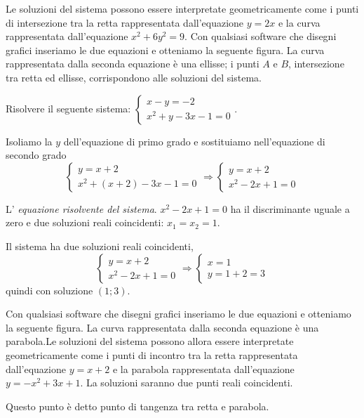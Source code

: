 \begin{esempio}
\begin{multicols}{2}
Le soluzioni del sistema possono essere interpretate geometricamente come i 
punti di intersezione tra la retta rappresentata dall'equazione $y=2x$ e la 
curva rappresentata dall'equazione $x^2+6y^2=9$. Con qualsiasi software che 
disegni grafici inseriamo le due equazioni e otteniamo la seguente figura.
La curva rappresentata dalla seconda equazione è una ellisse; i punti $ A $ e $ 
B $, intersezione tra retta ed ellisse, corrispondono alle soluzioni del 
sistema.
\begin{center}

\end{center}
 \end{multicols}
\end{esempio}

\begin{esempio}
Risolvere il seguente sistema: $\left\{\begin{array}{l}x-y=-2 
\\x^2+y-3x-1=0\end{array}\right..$

Isoliamo la $y$ dell'equazione di primo grado e sostituiamo nell'equazione di 
secondo grado 
\[\left\{\begin{array}{l}y=x+2 \\
x^2+\left(x+2\right)-3x-1=0\end{array}\right. 
\Rightarrow\left\{\begin{array}{l}y=x+2 \\
x^2-2x+1=0\end{array}\right.\]

L' \emph{equazione risolvente del sistema}. $x^2-2x+1=0$ ha il discriminante 
uguale a zero e due soluzioni reali coincidenti: $x_1=x_2=1$.

Il sistema ha due soluzioni reali coincidenti, 
\[\left\{\begin{array}{l}y=x+2 \\x^2-2x+1=0\end{array}\right. 
\Rightarrow\left\{\begin{array}{l}x=1 \\
y=1+2=3\end{array}\right.\] 
quindi con soluzione $(1;3)$.
\begin{multicols}{2}
Con qualsiasi software che disegni grafici inseriamo le due equazioni e 
otteniamo la seguente figura.
La curva rappresentata dalla seconda equazione è una parabola.Le soluzioni del 
sistema possono allora essere interpretate geometricamente come i punti di 
incontro tra la retta rappresentata dall'equazione $y=x+2$ e la parabola 
rappresentata dall'equazione $y=-x^2+3x+1$. La soluzioni saranno due punti 
reali 
coincidenti. 

Questo punto è detto punto di tangenza tra retta e parabola.
\begin{center}

\end{center}
 \end{multicols}
\end{esempio}

